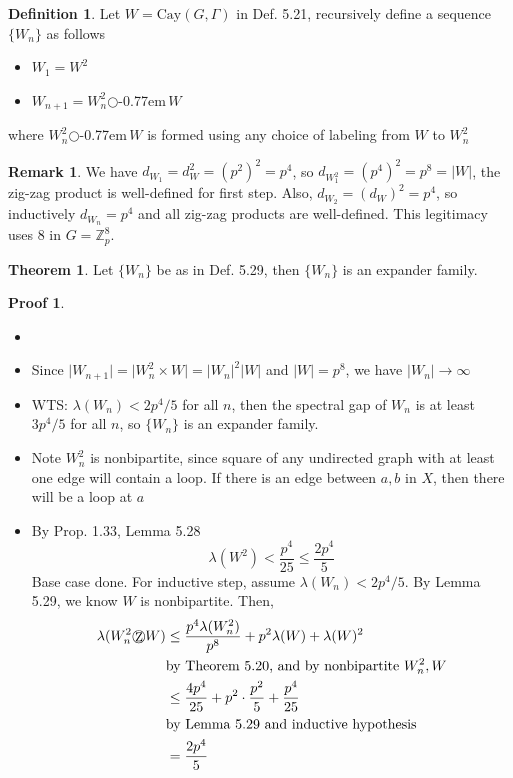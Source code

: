 \documentclass{book}
\newcommand{\Z}{\mathbb{Z}}
\newcommand{\zigzag}{$\bigcirc$\kern-0.77em\raisebox{-.16ex}{\small Z}$\,$}
\newcommand{\abs}[1]{\lvert #1 \rvert }
\newcommand{\Cay}[1]{\textrm{Cay}( #1 )}
\theoremstyle{definition}
\newtheorem{theorem}[lemma]{Theorem}
\newtheorem{definition}[lemma]{Definition}
\theoremstyle{remarkstyle}
\newtheorem*{remark}{Remark}%
\newtheorem*{myproof}{Proof}%
\begin{document}
\begin{definition}
    Let $W = \Cay{G,\Gamma}$ in Def. 5.21, recursively define a sequence $\{W_n\}$ as follows 
    \begin{itemize}
        \item $W_1=W^2$
        \item $W_{n+1} = W^2_n$\zigzag$W$
    \end{itemize}
    where $W^2_n$\zigzag$W$ is formed using any choice of labeling from $W$ to $W^2_n$
\end{definition}
\begin{remark}
    We have $d_{W_1} = d^2_W = (p^2)^2 = p^4 $, so $d_{W^2_1} = (p^4)^2 = p^8 = \abs{W} $, the zig-zag product is well-defined for first step. Also, $d_{W_2} = (d_W)^2 = p^4 $, so inductively $d_{W_n} = p^4 $ and all zig-zag products are well-defined. This legitimacy uses 8 in $G=\Z^8_p$. \newline
\end{remark}

\begin{theorem}
    Let $\{W_n\}$ be as in Def. 5.29, then $\{W_n\}$ is an expander family.
\end{theorem}
\begin{myproof}
    \begin{itemize}
        \item[]
        \item Since $\abs{W_{n+1} } = \abs{W^2_n\times W} = \abs{W_n}^2\abs{W} $ and $\abs{W}=p^8$, we have $\abs{W_n}\rightarrow\infty$
        \item WTS: $\lambda(W_n) < 2p^4/5 $ for all $n$, then the spectral gap of $W_n$ is at least $3p^4/5$ for all $n$, so $\{W_n\}$ is an expander family.
        \item Note $W^2_n$ is nonbipartite, since square of any undirected graph with at least one edge will contain a loop. If there is an edge between $a,b$ in $X$, then there will be a loop at $a$
        \item By Prop. 1.33, Lemma 5.28
        $$
        \lambda(W^2)<\frac{p^4}{25}\le \frac{2p^4}{5}
        $$
        Base case done. For inductive step, assume $\lambda(W_n) < 2p^4/5 $. By Lemma 5.29, we know $W$ is nonbipartite. Then,
        \begin{align*}
            \lambda(W^2_n\textrm{\zigzag}W) 
            &\le \frac{p^4\lambda(W^2_n)}{p^8} + p^2\lambda(W) + \lambda(W)^2 \\
            &\textrm{by Theorem 5.20, and by nonbipartite $W^2_n, W$} \\
            &\le \frac{4p^4}{25} + p^2\cdot \frac{p^2}{5} + \frac{p^4}{25} \\
            &\textrm{by Lemma 5.29 and inductive hypothesis} \\
            &= \frac{2p^4}{5}
        \end{align*}
    \end{itemize}
\end{myproof}
\end{document}
